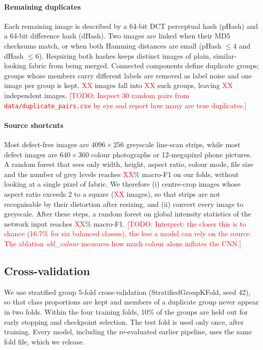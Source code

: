\documentclass[preprint,12pt,authoryear]{elsarticle}
\newcommand{\todo}[1]{\textcolor{red}{[TODO: #1]}}
\providecommand{\NClean}{\textcolor{red}{XX}}
\providecommand{\NDupGroups}{\textcolor{red}{XX}}
\providecommand{\NDupImages}{\textcolor{red}{XX}}
\providecommand{\NCropped}{\textcolor{red}{XX}}
\providecommand{\ShortcutMetaFone}{\textcolor{red}{XX}}
\providecommand{\ShortcutPixFone}{\textcolor{red}{XX}}
\begin{document}
\paragraph{Remaining duplicates}
Each remaining image is described by a 64-bit DCT perceptual hash (pHash) and a 64-bit difference
hash (dHash). Two images are linked when their MD5 checksums match, or when both Hamming distances
are small (pHash $\le 4$ and dHash $\le 6$). Requiring both hashes keeps distinct images of plain,
similar-looking fabric from being merged. Connected components define duplicate groups; groups
whose members carry different labels are removed as label noise and one image per group is kept.
\NDupImages{} images fall into \NDupGroups{} such groups, leaving \NClean{} independent images.
\todo{Inspect 30 random pairs from \texttt{data/duplicate\_pairs.csv} by eye and report how many are
true duplicates.}

\paragraph{Source shortcuts}
Most defect-free images are $4096\times256$ greyscale line-scan strips, while most defect images
are $640\times360$ colour photographs or 12-megapixel phone pictures. A random forest that sees
only width, height, aspect ratio, colour mode, file size and the number of grey levels reaches
\ShortcutMetaFone\% macro-F1 on our folds, without looking at a single pixel of fabric. We
therefore (i) centre-crop images whose aspect ratio exceeds 2 to a square (\NCropped{} images), so
that strips are not recognisable by their distortion after resizing, and (ii) convert every image to
greyscale. After these steps, a random forest on global intensity statistics of the network input
reaches \ShortcutPixFone\% macro-F1. \todo{Interpret: the closer this is to chance (16.7\% for six
balanced classes), the less a model can rely on the source. The ablation \emph{abl\_colour}
measures how much colour alone inflates the CNN.}

\subsection{Cross-validation}
We use stratified group 5-fold cross-validation (StratifiedGroupKFold, seed 42), so that class
proportions are kept and members of a duplicate group never appear in two folds. Within the four
training folds, 10\% of the groups are held out for early stopping and checkpoint selection. The
test fold is used only once, after training. Every model, including the re-evaluated earlier
pipeline, uses the same fold file, which we release.
\end{document}
